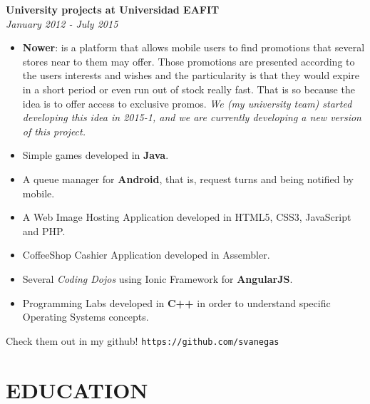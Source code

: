 \documentclass[margin, 10pt]{res} %
\begin{document}
\begin{resume}
\textbf{University projects at Universidad EAFIT} \\
\textit{January 2012 - July 2015} \\
\begin{itemize}
  \item \textbf{Nower}: is a platform that allows mobile users to find promotions that several
        stores near to them may offer. Those promotions are presented according to the users
        interests and wishes and the particularity is that they would expire in a short period or
        even run out of stock really fast. That is so because the idea is to offer access to
        exclusive promos.
        \emph{We (my university team) started developing this idea in 2015-1, and we are currently
              developing a new version of this project.}\\
  \item Simple games developed in \textbf{Java}.
  \item A queue manager for \textbf{Android}, that is, request turns and being notified by mobile.
  \item A Web Image Hosting Application developed in HTML5, CSS3, JavaScript and PHP.
  \item CoffeeShop Cashier Application developed in Assembler.
  \item Several \textit{Coding Dojos} using Ionic Framework for \textbf{AngularJS}.
  \item Programming Labs developed in \textbf{C++} in order to understand specific Operating Systems
        concepts.
\end{itemize}
Check them out in my github! \texttt{https://github.com/svanegas}


\section{EDUCATION}


\end{resume}
\end{document}
